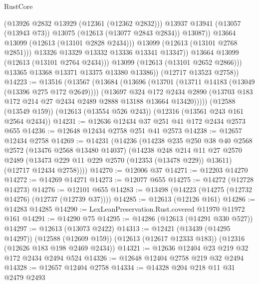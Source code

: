 \begin{lexlean}{RustCore}
\begin{coremodule}
                          (@13926 @2832 @13929 (@12361 (@12362 @2832)))
                          @13937
                          @13941
                          (@13057 (@13943 @73))
                          @13075
                          (@12613 (@13077 @2843 @2834))
                          @13087))
                      @13664
                      @13099
                      (@12613 (@13101 @2828 @2434)))
                    @13099
                    (@12613 (@13101 @2768 @2851)))
                  @13326
                  @13329
                  @13332
                  @13336
                  @13341
                  @13347))
              @13664
              @13099
              (@12613 (@13101 @2764 @2434)))
            @13099
            (@12613 (@13101 @2652 @2866)))
          @13365
          @13368
          @13371
          @13375
          @13380
          @13386))
      (@12717 @13523 @2758))
@14223 := @13516
    (@13567
      (@13684
        (@13696
          (@13701 (@13711 @14183 (@13049 (@13396 @275 @172 @2649))))
          (@13697
            @324
            @172
            @2434
            @2890
            (@13703 @183 @172 @214 @27 @2434 @2489 @2888 @13188 @13664 @13420)))))
    (@12588 (@13549 @159))
    (@12613 (@13554 @526 @243))
    (@12316 (@13561 @243 @161 @2564 @2434))
@14231 := @12636 @12434 @37 @251 @41 @172 @2434 @2573 @655
@14236 := @12648 @12434 @2758 @251 @41 @2573
@14238 := @12657 @12434 @2758
@14269 := @14231
    (@14236
      (@14238
        @235
        @250
        @38
        @40
        @2568
        @2572
        (@13476 @2568 @13480 @14037)
        (@14238
          @248
          @214
          @11
          @27
          @2570
          @2489
          (@13473 @229 @11 @229 @2570 (@12353 (@13478 @229)) @13611)
          (@12717 @12434 @2758))))
@14270 := @12006 @37
@14271 := @12203 @14270
@14272 := @14269 @14271
@14273 := @12077 @655
@14275 := @14272 (@12728 @14273)
@14276 := @12101 @655
@14283 := @13498 (@14223 (@14275 (@12732 @14276) (@12737 (@12739 @37))))
@14285 := @12613 (@12126 @161)
@14286 := @14283 @14285
@14290 := LexLeanPreservation.Rust.covered @11970 @11972 @161
@14291 := @14290 @75
@14295 := @14286 (@12613 (@14291 @330 @527))
@14297 := @12613 (@13073 @2422)
@14313 := @12421
    (@13439 (@14295 @14297))
    (@12588 (@12609 @159))
    (@12613 (@12617 @12333 @183))
    (@12316 (@12626 @183 @198 @2469 @2434))
@14321 := @12636 @12404 @23 @219 @32 @172 @2434 @2494 @524
@14326 := @12648 @12404 @2758 @219 @32 @2494
@14328 := @12657 @12404 @2758
@14334 := @14328 @204 @218 @11 @31 @2479 @2493

\end{coremodule}
\end{lexlean}
